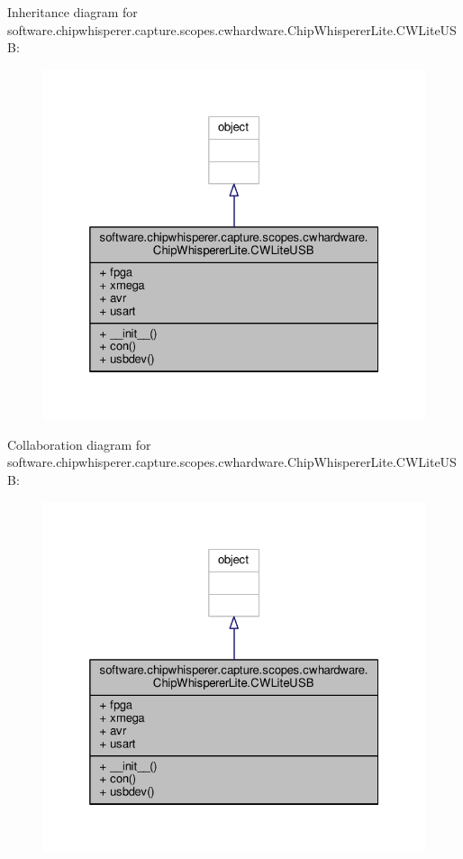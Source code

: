 Inheritance diagram for software.\+chipwhisperer.\+capture.\+scopes.\+cwhardware.\+Chip\+Whisperer\+Lite.\+C\+W\+Lite\+U\+S\+B\+:\nopagebreak
\begin{figure}[H]
\begin{center}
\leavevmode
\includegraphics[width=325pt]{d8/d6e/classsoftware_1_1chipwhisperer_1_1capture_1_1scopes_1_1cwhardware_1_1ChipWhispererLite_1_1CWLiteUSB__inherit__graph}
\end{center}
\end{figure}


Collaboration diagram for software.\+chipwhisperer.\+capture.\+scopes.\+cwhardware.\+Chip\+Whisperer\+Lite.\+C\+W\+Lite\+U\+S\+B\+:\nopagebreak
\begin{figure}[H]
\begin{center}
\leavevmode
\includegraphics[width=325pt]{d6/d98/classsoftware_1_1chipwhisperer_1_1capture_1_1scopes_1_1cwhardware_1_1ChipWhispererLite_1_1CWLiteUSB__coll__graph}
\end{center}
\end{figure}


